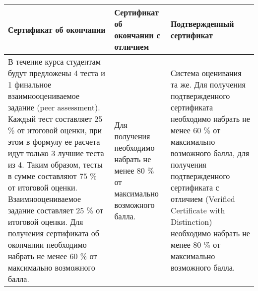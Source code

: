 \documentclass[a4paper,12pt]{article}
\begin{document}
\begin{tabularx}{\textwidth}[left]{Y|X|Z}
 Сертификат об окончании & Сертификат об окончании с отличием & Подтвержденный сертификат  \\ 
\hline
\hline 
В течение курса студентам будут предложены 4 теста и 1 финальное взаимнооцениваемое задание (peer assessment). Каждый тест составляет 25 \% от итоговой оценки, при этом в формулу ее расчета идут только 3 лучшие теста из 4. Таким образом, тесты в сумме составляют 75 \% от итоговой оценки. Взаимнооцениваемое задание составляет 25 \% от итоговой оценки. Для получения сертификата об окончании необходимо набрать не менее 60 \% от максимально возможного балла. 
 & Для получения необходимо набрать не менее 80 \% от максимально возможного балла.
  & Система оценивания та же. Для получения подтвержденного сертификата необходимо набрать не менее 60 \% от максимально возможного балла, для получения подтвержденного сертификата с отличием (Verified Certificate with Distinction) необходимо набрать не менее 80 \% от максимально возможного балла. \\
\end{tabularx}
\end{document}
